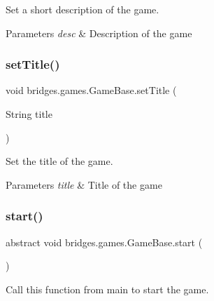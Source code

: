 Set a short description of the game. 


\begin{DoxyParams}{Parameters}
{\em desc} & Description of the game \\
\hline
\end{DoxyParams}
\mbox{\label{classbridges_1_1games_1_1_game_base_a9f55e84af9bbf6497b314181c9d79f0a}} 
\subsubsection{\texorpdfstring{setTitle()}{setTitle()}}
{\footnotesize\ttfamily void bridges.\+games.\+Game\+Base.\+set\+Title (\begin{DoxyParamCaption}\item[{String}]{title }\end{DoxyParamCaption})\hspace{0.3cm}{\ttfamily [protected]}}



Set the title of the game. 


\begin{DoxyParams}{Parameters}
{\em title} & Title of the game \\
\hline
\end{DoxyParams}
\mbox{\label{classbridges_1_1games_1_1_game_base_a4b09bc799726e4a59b1ab039b941b188}} 
\subsubsection{\texorpdfstring{start()}{start()}}
{\footnotesize\ttfamily abstract void bridges.\+games.\+Game\+Base.\+start (\begin{DoxyParamCaption}{ }\end{DoxyParamCaption})\hspace{0.3cm}{\ttfamily [abstract]}}



Call this function from main to start the game. 

\mbox{\label{classbridges_1_1games_1_1_game_base_a3b0898cf9a8348245cd16382d670b486}} 
